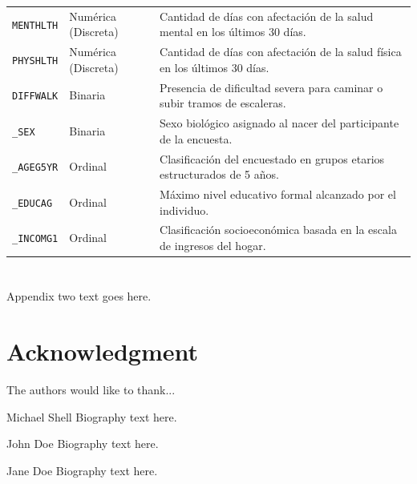 \documentclass[journal]{IEEEtran}
\begin{document}
\begin{table}[t]
\begin{tabular}{|l|l|p{11cm}|}
\texttt{MENTHLTH}  & Numérica (Discreta)   & Cantidad de días con afectación de la salud mental en los últimos 30 días. \\
\texttt{PHYSHLTH}  & Numérica (Discreta)   & Cantidad de días con afectación de la salud física en los últimos 30 días. \\
\texttt{DIFFWALK}  & Binaria               & Presencia de dificultad severa para caminar o subir tramos de escaleras. \\
\texttt{\_SEX}     & Binaria               & Sexo biológico asignado al nacer del participante de la encuesta. \\
\texttt{\_AGEG5YR} & Ordinal               & Clasificación del encuestado en grupos etarios estructurados de 5 años. \\
\texttt{\_EDUCAG}  & Ordinal               & Máximo nivel educativo formal alcanzado por el individuo. \\
\texttt{\_INCOMG1} & Ordinal               & Clasificación socioeconómica basada en la escala de ingresos del hogar. \\
\hline
\end{tabular}
\end{table}


\section{}
Appendix two text goes here.

\section*{Acknowledgment}


The authors would like to thank...

\ifCLASSOPTIONcaptionsoff
  \newpage
\fi





\begin{IEEEbiography}{Michael Shell}
Biography text here.
\end{IEEEbiography}

\begin{IEEEbiographynophoto}{John Doe}
Biography text here.
\end{IEEEbiographynophoto}


\begin{IEEEbiographynophoto}{Jane Doe}
Biography text here.
\end{IEEEbiographynophoto}

\end{document}
